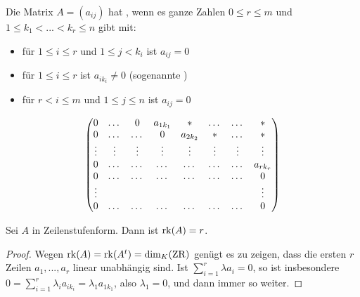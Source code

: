 \begin{definition}[Zeilenstufenform]
	Die Matrix $A=(a_{ij})$ hat , wenn es ganze Zahlen $0\le r \le m$ und $1\le 
	k_1<...<k_r\le n$ gibt mit:
	\begin{itemize}
		\item für $1\le i \le r$ und $1\le j < k_i$ ist $a_{ij}=0$
		\item für $1\le i \le r$ ist $a_{ik_{i}}\neq 0$ (sogenannte )
		\item für $r<i\le m$ und $1\le j\le n$ ist $a_{ij}=0$
	\end{itemize}
	\begin{align}
		\begin{pmatrix}
		0 & \dots & 0 & a_{1k_{1}} & * & \dots & \dots & *\\
		0 & \dots & \dots & 0 & a_{2k_{2}} & * & \dots & *\\
		\vdots & \vdots & \vdots & \vdots & \vdots & \vdots & \vdots & \vdots\\
		0 & \dots & \dots & \dots & \dots & \dots & \dots & a_{rk_{r}}\\
		0 & \dots & \dots & \dots & \dots & \dots & \dots & 0\\
		\vdots & \; & \; & \; & \; & \; & \; & \vdots\\
		0 & \dots & \dots & \dots & \dots & \dots & \dots & 0\\
		\end{pmatrix}\notag
	\end{align}
\end{definition}

\begin{lemma}
	Sei $A$ in Zeilenstufenform. Dann ist $\operatorname{rk}(A)=r$.
\end{lemma}
\begin{proof}
	Wegen $\operatorname{rk}(A)=\operatorname{rk}(A^t)=\dim_K(\operatorname{ZR})$ genügt es zu zeigen, dass die ersten $r$ Zeilen $a_1,...,a_r$ linear unabhängig sind. Ist $\sum
	_{i=1}^r \lambda a_i=0$, so ist insbesondere $0=\sum_{i=1}^r \lambda_i a_{ik_{i}}=\lambda_1 a_{1k_{1}}$, also $\lambda_1
	=0$, und dann immer so weiter.
\end{proof}

